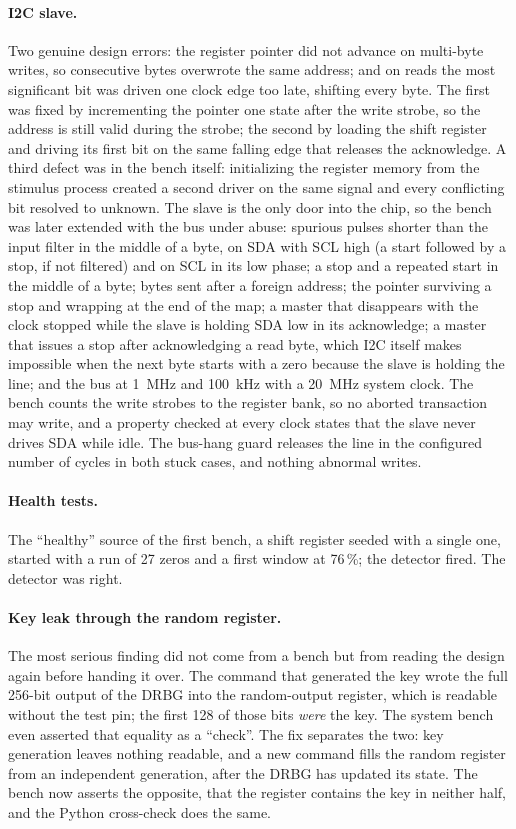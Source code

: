 \paragraph{I2C slave.} Two genuine design errors: the register pointer
did not advance on multi-byte writes, so consecutive bytes overwrote the
same address; and on reads the most significant bit was driven one clock
edge too late, shifting every byte. The first was fixed by incrementing
the pointer one state after the write strobe, so the address is still
valid during the strobe; the second by loading the shift register and
driving its first bit on the same falling edge that releases the
acknowledge. A third defect was in the bench itself: initializing the
register memory from the stimulus process created a second driver on the
same signal and every conflicting bit resolved to unknown. The slave is
the only door into the chip, so the bench was later extended with the bus
under abuse: spurious pulses shorter than the input filter in the middle
of a byte, on SDA with SCL high (a start followed by a stop, if not
filtered) and on SCL in its low phase; a stop and a repeated start in the
middle of a byte; bytes sent after a foreign address; the pointer
surviving a stop and wrapping at the end of the map; a master that
disappears with the clock stopped while the slave is holding SDA low in
its acknowledge; a master that issues a stop after acknowledging a read
byte, which \ac{I2C} itself makes impossible when the next byte starts
with a zero because the slave is holding the line; and the bus at
1~MHz and 100~kHz with a 20~MHz system clock. The bench counts the write
strobes to the register bank, so no aborted transaction may write, and a
property checked at every clock states that the slave never drives SDA
while idle. The bus-hang guard releases the line in the configured number
of cycles in both stuck cases, and nothing abnormal writes.

\paragraph{Health tests.} The ``healthy'' source of the first bench, a
shift register seeded with a single one, started with a run of 27 zeros
and a first window at 76\,\%; the detector fired. The detector was right.

\paragraph{Key leak through the random register.} The most serious
finding did not come from a bench but from reading the design again
before handing it over. The command that generated the key wrote the
full 256-bit output of the DRBG into the random-output register, which is
readable without the test pin; the first 128 of those bits \emph{were} the
key. The system bench even asserted that equality as a ``check''. The fix
separates the two: key generation leaves nothing readable, and a new
command fills the random register from an independent generation, after
the DRBG has updated its state. The bench now asserts the opposite, that
the register contains the key in neither half, and the Python
cross-check does the same.

